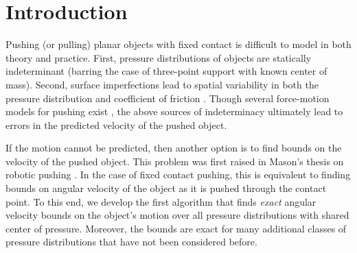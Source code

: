 \documentclass[conference]{IEEEtran}
\newcommand{\TODO}[1]{{\color{red} {{#1}}  }}
\begin{document}
\IEEEpeerreviewmaketitle

\section{Introduction}





Pushing (or pulling) planar objects with fixed contact is difficult to
model in both theory and practice. First, pressure distributions of
objects are statically indeterminant (barring the case of three-point
support with known center of mass). Second, surface imperfections lead
to spatial variability in both the pressure distribution and
coefficient of friction \cite{YuBFR16}. Though several force-motion
models for pushing exist
\cite{zhou2016convex,howe1996practical,goyal1991planar}, the above
sources of indeterminacy ultimately lead to errors in the predicted
velocity of the pushed object.

If the motion cannot be predicted, then another option is to find
bounds on the velocity of the pushed object. This problem was first
raised in Mason's thesis on robotic pushing \cite{Mason1982}. In the
case of fixed contact pushing, this is equivalent to finding bounds on
angular velocity of the object as it is pushed through the contact
point. To this end, we develop the first algorithm that finds
\textit{exact} angular velocity bounds on the object's motion over all
pressure distributions with shared center of pressure. Moreover, the
bounds are exact for many additional classes of pressure distributions
that have not been considered before.
\end{document}
